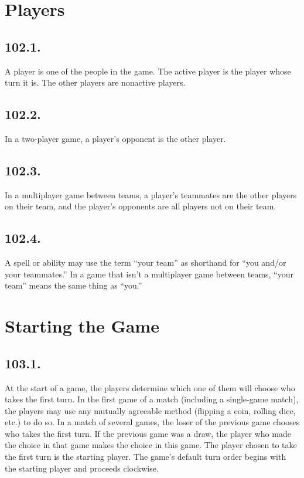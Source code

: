 \section{Players}
\subsection*{102.1.}
A player is one of the people in the game. The active player is the player whose turn it is. The other players are nonactive players.

\subsection*{102.2.}
In a two-player game, a player’s opponent is the other player.

\subsection*{102.3.}
In a multiplayer game between teams, a player’s teammates are the other players on their team, and the player’s opponents are all players not on their team.

\subsection*{102.4.}
A spell or ability may use the term “your team” as shorthand for “you and/or your teammates.” In a game that isn’t a multiplayer game between teams, “your team” means the same thing as “you.”

\section{Starting the Game}
\subsection*{103.1.}
At the start of a game, the players determine which one of them will choose who takes the first turn. In the first game of a match (including a single-game match), the players may use any mutually agreeable method (flipping a coin, rolling dice, etc.) to do so. In a match of several games, the loser of the previous game chooses who takes the first turn. If the previous game was a draw, the player who made the choice in that game makes the choice in this game. The player chosen to take the first turn is the starting player. The game’s default turn order begins with the starting player and proceeds clockwise.

